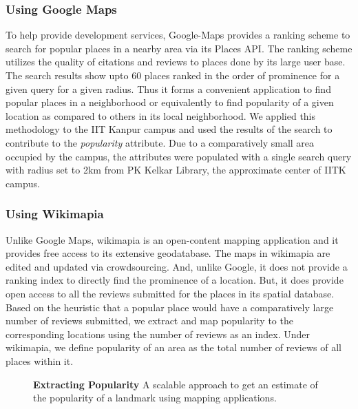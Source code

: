 \documentclass{iitkthesis}
\begin{document}
\subsubsection*{Using Google Maps}
To help provide development services, Google-Maps provides a ranking 
scheme to search for popular places in a nearby area via its Places API. 
The ranking scheme utilizes the quality of citations and reviews to 
places done by its large user base. The search results show 
upto 60 places ranked in the order of prominence for a given query for a 
given radius. Thus it forms a convenient application to find popular 
places in a neighborhood or equivalently to find popularity of a given 
location as compared to others in its local neighborhood. We applied this 
methodology to the IIT Kanpur campus and used the results of the search to 
contribute to the \textit{popularity} attribute. Due to a comparatively 
small area occupied by the campus, the attributes were populated with a 
single search query with radius set to 2km from PK Kelkar Library, the 
approximate center of IITK campus.

\subsubsection*{Using Wikimapia}
Unlike Google Maps, wikimapia is an open-content mapping application and 
it provides free access to its extensive geodatabase. The maps in 
wikimapia are edited and updated via crowdsourcing. And, unlike 
Google, it does not provide a ranking index to directly find the 
prominence of a location. But, it does provide open access to all the 
reviews submitted for the places in its spatial database. Based on the 
heuristic that a popular place would have a comparatively large number of 
reviews submitted, we extract and map popularity to the corresponding 
locations using the number of reviews as an index. Under wikimapia, we 
define popularity of an area as the total number of reviews of 
all places within it.
\begin{figure}
\centering
{}
\caption{\textbf{\textbf{Extracting Popularity}} A scalable approach to 
get an estimate of the popularity of a landmark using 
mapping applications.}
\label{fig:popular}
 \end{figure}
\end{document}
